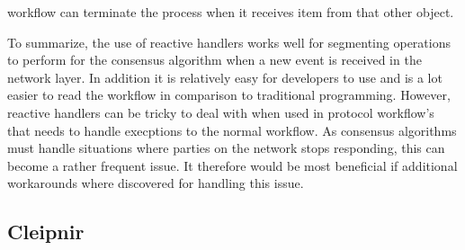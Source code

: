 workflow can terminate the process when it receives item from that other  object. 

To summarize, the use of reactive handlers works well for segmenting operations to perform for the consensus algorithm when a new event is received in the network layer. In addition it is relatively easy for developers to use and is a lot easier to read the workflow in comparison to traditional programming. However, reactive handlers can be tricky to deal with when used in protocol workflow's that needs to handle execptions to the normal workflow. As consensus algorithms must handle situations where parties on the network stops responding, this can become a rather frequent issue. It therefore would be most beneficial if additional workarounds where discovered for handling this issue.  

\subsection{Cleipnir}
